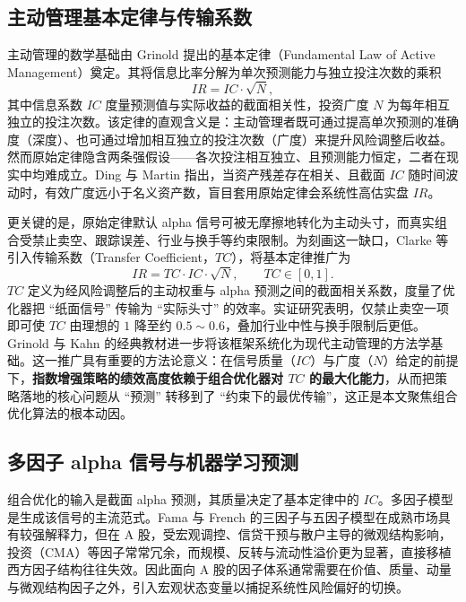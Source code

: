 \subsection{主动管理基本定律与传输系数}
主动管理的数学基础由 Grinold\cite{Grinold1989} 提出的基本定律（Fundamental Law of Active Management）奠定。其将信息比率分解为单次预测能力与独立投注次数的乘积
\begin{equation}
IR = IC\cdot\sqrt{N},
\end{equation}
其中信息系数 $IC$ 度量预测值与实际收益的截面相关性，投资广度 $N$ 为每年相互独立的投注次数。该定律的直观含义是：主动管理者既可通过提高单次预测的准确度（深度）、也可通过增加相互独立的投注次数（广度）来提升风险调整后收益。然而原始定律隐含两条强假设——各次投注相互独立、且预测能力恒定，二者在现实中均难成立。Ding 与 Martin\cite{Ding2017} 指出，当资产残差存在相关、且截面 $IC$ 随时间波动时，有效广度远小于名义资产数，盲目套用原始定律会系统性高估实盘 $IR$。

更关键的是，原始定律默认 alpha 信号可被无摩擦地转化为主动头寸，而真实组合受禁止卖空、跟踪误差、行业与换手等约束限制。为刻画这一缺口，Clarke 等\cite{Clarke2002} 引入传输系数（Transfer Coefficient，$TC$），将基本定律推广为
\begin{equation}
IR = TC\cdot IC\cdot\sqrt{N},\qquad TC\in[0,1].
\end{equation}
$TC$ 定义为经风险调整后的主动权重与 alpha 预测之间的截面相关系数，度量了优化器把 ``纸面信号'' 传输为 ``实际头寸'' 的效率。实证研究表明，仅禁止卖空一项即可使 $TC$ 由理想的 $1$ 降至约 $0.5\!\sim\!0.6$，叠加行业中性与换手限制后更低。Grinold 与 Kahn\cite{Grinold2000} 的经典教材进一步将该框架系统化为现代主动管理的方法学基础。这一推广具有重要的方法论意义：在信号质量（$IC$）与广度（$N$）给定的前提下，\textbf{指数增强策略的绩效高度依赖于组合优化器对 $TC$ 的最大化能力}，从而把策略落地的核心问题从 ``预测'' 转移到了 ``约束下的最优传输''，这正是本文聚焦组合优化算法的根本动因。

\subsection{多因子 alpha 信号与机器学习预测}
组合优化的输入是截面 alpha 预测，其质量决定了基本定律中的 $IC$。多因子模型是生成该信号的主流范式。Fama 与 French\cite{Fama2015} 的三因子与五因子模型在成熟市场具有较强解释力，但在 A 股，受宏观调控、信贷干预与散户主导的微观结构影响，投资（CMA）等因子常常冗余，而规模、反转与流动性溢价更为显著，直接移植西方因子结构往往失效。因此面向 A 股的因子体系通常需要在价值、质量、动量与微观结构因子之外，引入宏观状态变量以捕捉系统性风险偏好的切换。

